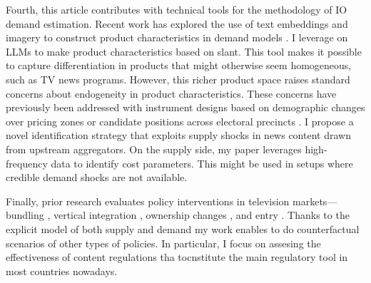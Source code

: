 \documentclass[12pt]{article}
\begin{document}
Fourth, this article contributes with technical tools for the methodology of IO demand estimation. Recent work has explored the use of text embeddings and imagery to construct product characteristics in demand models \citep{compiani2025demandestimationtextimage}. I leverage on LLMs to make product characteristics based on slant. This tool makes it possible to capture differentiation in products that might otherwise seem homogeneous, such as TV news programs. However, this richer product space raises standard concerns about endogeneity in product characteristics. These concerns have previously been addressed with instrument designs based on demographic changes over pricing zones \citep{fan} or candidate positions across electoral precincts \citep{longuet-marx2025party}. I propose a novel identification strategy that exploits supply shocks in news content drawn from upstream aggregators. On the supply side, my paper leverages high-frequency data to identify cost parameters. This might be used in setups where credible demand shocks are not available. 


Finally, prior research evaluates policy interventions in television markets—bundling \citep{crawford_yurukoglu}, vertical integration \citep{crawford_vertical}, ownership changes \citep{MARTIN_McCRAIN_2019,CageHengelHerveUrvoy2022}, and entry \citep{prat_stromberg_entry}. Thanks to the explicit model of both supply and demand my work enables to do counterfactual scenarios of other types of policies. In particular, I focus on assesing the effectiveness of content regulations tha tocnstitute the main regulatory tool in most countries nowadays. 
\end{document}
